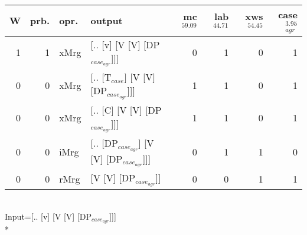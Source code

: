 \begin{tabularx}{\linewidth}{rrlXrrrr}
\hline
   W &   prb. & opr.   & output                                   &   mc$^{59.09}$ &   lab$^{44.71}$ &   xws$^{54.45}$ &   case$_{agr}^{3.95}$ \\
\hline
   1 &   1 & xMrg & [.. [v] [V [V] [DP$_{case_{agr}}$]]]           &            0 &             1 &             0 &                  1 \\
   0 &   0 & xMrg & [.. [T$_{case}$] [V [V] [DP$_{case_{agr}}$]]]      &            1 &             1 &             0 &                  1 \\
   0 &   0 & xMrg & [.. [C] [V [V] [DP$_{case_{agr}}$]]]           &            1 &             1 &             0 &                  1 \\
   0 &   0 & iMrg & [.. [DP$_{case_{agr}}$] [V [V] [DP$_{case_{agr}}$]]] &            0 &             1 &             1 &                  0 \\
   0 &   0 & rMrg & [V [V] [DP$_{case_{agr}}$]]                    &            0 &             0 &             1 &                  1 \\
\hline
\end{tabularx}\endgroup\\
\begingroup\scriptsize Input=[.. [v] [V [V] [DP$_{case_{agr}}$]]]\\*
